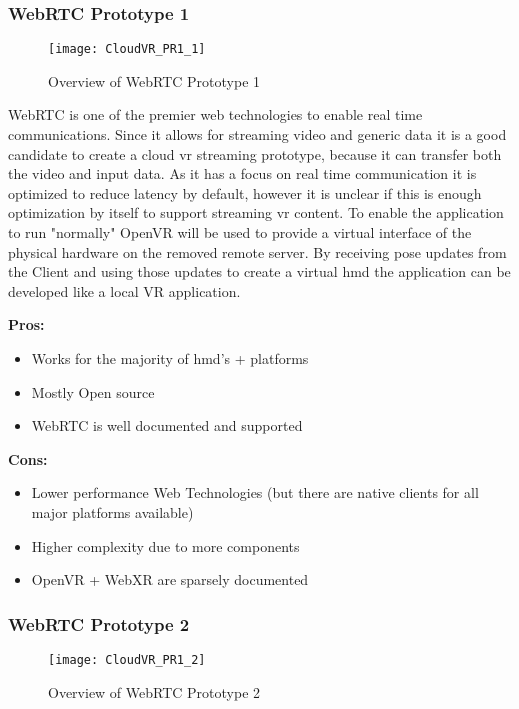 \newpage

\subsubsection{WebRTC Prototype 1}
\begin{figure}[h!]
\caption{Overview of WebRTC Prototype 1}
\label{fig:pr11}
\texttt{[image: CloudVR\_PR1\_1]}
\end{figure}

WebRTC is one of the premier web technologies to enable real time communications. Since it allows for streaming video and generic data it is a good candidate to create a cloud \acrshort{vr} streaming prototype, because it can transfer both the video and input data. As it has a focus on real time communication it is optimized to reduce latency by default, however it is unclear if this is enough optimization by itself to support streaming \acrshort{vr} content. To enable the application to run "normally" OpenVR will be used to provide a virtual interface of the physical hardware on the removed remote server. By receiving pose updates from the Client and using those updates to create a virtual \acrshort{hmd} the application can be developed like a local VR application. \\
\newline
\begin{varwidth}[t]{.5\textwidth}
\renewcommand\labelitemi{+}
\textbf{Pros:}
\begin{itemize}
\item Works for the majority of \acrshort{hmd}'s + platforms
\item Mostly Open source
\item WebRTC is well documented and supported
\end{itemize}
\end{varwidth}
\hspace{4em}
\begin{varwidth}[t]{.5\textwidth}
\renewcommand\labelitemi{-}
\textbf{Cons:}
\begin{itemize}
\item Lower performance Web Technologies (but there are native clients for all major platforms available)
\item Higher complexity due to more components
\item OpenVR + WebXR are sparsely documented
\end{itemize}
\end{varwidth}

\subsubsection{WebRTC Prototype 2}
\begin{figure}[h!]
\caption{Overview of WebRTC Prototype 2}
\label{fig:pr12}
\texttt{[image: CloudVR\_PR1\_2]}
\end{figure}

